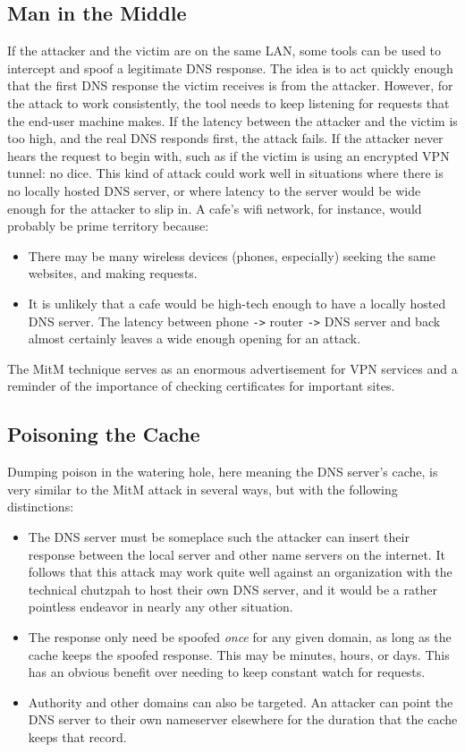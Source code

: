 \documentclass{article}
\begin{document}
\subsection{Man in the Middle}
	If the attacker and the victim are on the same LAN, some tools can be
	used to intercept and spoof a legitimate DNS response. The idea is to
	act quickly enough that the first DNS response the victim receives is
	from the attacker.  However, for the attack to work consistently, the
	tool needs to keep listening for requests that the end-user machine
	makes. If the latency between the attacker and the victim is too high,
	and the real DNS responds first, the attack fails. If the attacker
	never hears the request to begin with, such as if the victim is using
	an encrypted VPN tunnel: no dice. This kind of attack could work well
	in situations where there is no locally hosted DNS server, or where
	latency to the server would be wide enough for the attacker to slip in.
	A cafe's wifi network, for instance, would probably be prime territory
	because:
\begin{itemize}
	\item There may be many wireless devices (phones, especially) seeking
		the same websites, and making requests.
	\item It is unlikely that a cafe would be high-tech enough to have a
		locally hosted DNS server. The latency between phone \verb'->'
		router \verb'->' DNS server and back almost certainly leaves a
		wide enough opening for an attack.
\end{itemize}

	The MitM technique serves as an enormous advertisement for VPN services
	and a reminder of the importance of checking certificates for important
	sites.

\subsection{Poisoning the Cache}
	Dumping poison in the watering hole, here meaning the DNS server's
	cache, is very similar to the MitM attack in several ways, but with the
	following distinctions:
	\begin{itemize}
		\item The DNS server must be someplace such the attacker can
			insert their response between the local server and
			other name servers on the internet. It follows that
			this attack may work quite well against an organization
			with the technical chutzpah to host their own DNS
			server, and it would be a rather pointless endeavor in
			nearly any other situation.
		\item The response only need be spoofed {\em once} for any
			given domain, as long as the cache keeps the spoofed
			response. This may be minutes, hours, or days. This has
			an obvious benefit over needing to keep constant watch
			for requests.
		\item Authority and other domains can also be targeted. An
			attacker can point the DNS server to their own
			nameserver elsewhere for the duration that the cache
			keeps that record.
	\end{itemize}
\end{document}
